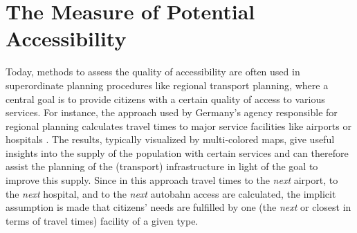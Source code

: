 \section{The Measure of Potential Accessibility}
\label{sec:potential}
Today, methods to assess the quality of accessibility are often used in superordinate planning procedures like 
regional transport planning, where a central goal is to provide 
citizens with a certain quality of access to various services. For instance, the approach used by Germany's agency 
responsible for regional planning calculates travel times to major service facilities like airports or hospitals \citep{BBSR20xxErreichbarkeitsmodell}. The results, typically visualized by multi-colored maps, give useful insights 
into the supply of the population with certain services and can therefore assist the planning of the (transport) 
infrastructure in light of the goal to improve this supply.
Since in this approach travel times to the \emph{next} airport, to the \emph{next} hospital, and to the \emph{next} 
autobahn access are calculated, the implicit assumption is made that citizens' needs are fulfilled by one (\ie the \emph{next} 
or closest in terms of travel times) facility of a given type.


